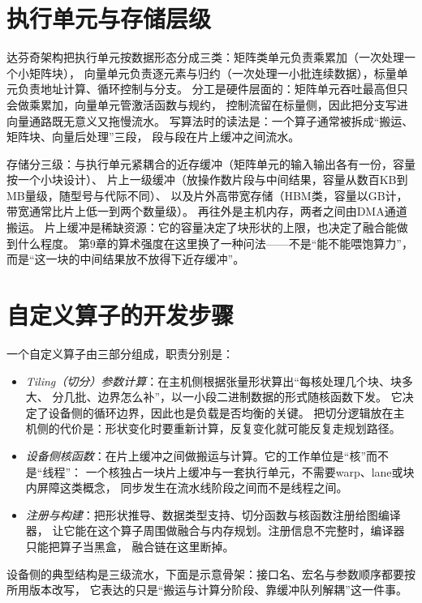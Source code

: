 \documentclass[12pt,a4paper,fontset=fandol]{ctexbook}
\begin{document}
\section{执行单元与存储层级}

达芬奇架构把执行单元按数据形态分成三类：矩阵类单元负责乘累加（一次处理一个小矩阵块），
向量单元负责逐元素与归约（一次处理一小批连续数据），标量单元负责地址计算、循环控制与分支。
分工是硬件层面的：矩阵单元吞吐最高但只会做乘累加，向量单元管激活函数与规约，
控制流留在标量侧，因此把分支写进向量通路既无意义又拖慢流水。
写算法时的读法是：一个算子通常被拆成``搬运、矩阵块、向量后处理''三段，
段与段在片上缓冲之间流水。

存储分三级：与执行单元紧耦合的近存缓冲（矩阵单元的输入输出各有一份，容量按一个小块设计）、
片上一级缓冲（放操作数片段与中间结果，容量从数百KB到MB量级，随型号与代际不同）、
以及片外高带宽存储（HBM类，容量以GB计，带宽通常比片上低一到两个数量级）。
再往外是主机内存，两者之间由DMA通道搬运。
片上缓冲是稀缺资源：它的容量决定了块形状的上限，也决定了融合能做到什么程度。
第9章的算术强度在这里换了一种问法——不是``能不能喂饱算力''，
而是``这一块的中间结果放不放得下近存缓冲''。

\section{自定义算子的开发步骤}

一个自定义算子由三部分组成，职责分别是：
\begin{itemize}
\item \emph{Tiling（切分）参数计算}：在主机侧根据张量形状算出``每核处理几个块、块多大、
      分几批、边界怎么补''，以一小段二进制数据的形式随核函数下发。
      它决定了设备侧的循环边界，因此也是负载是否均衡的关键。
      把切分逻辑放在主机侧的代价是：形状变化时要重新计算，反复变化就可能反复走规划路径。
\item \emph{设备侧核函数}：在片上缓冲之间做搬运与计算。它的工作单位是``核''而不是``线程''：
      一个核独占一块片上缓冲与一套执行单元，不需要warp、lane或块内屏障这类概念，
      同步发生在流水线阶段之间而不是线程之间。
\item \emph{注册与构建}：把形状推导、数据类型支持、切分函数与核函数注册给图编译器，
      让它能在这个算子周围做融合与内存规划。注册信息不完整时，编译器只能把算子当黑盒，
      融合链在这里断掉。
\end{itemize}

设备侧的典型结构是三级流水，下面是示意骨架：接口名、宏名与参数顺序都要按所用版本改写，
它表达的只是``搬运与计算分阶段、靠缓冲队列解耦''这一件事。
\end{document}
